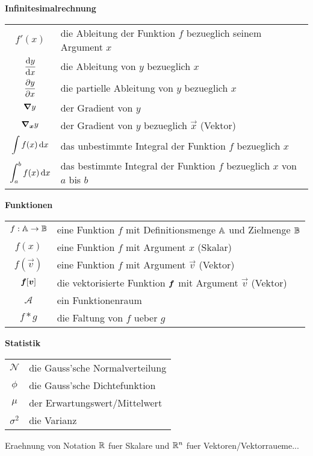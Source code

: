\begin{center}\textbf{Infinitesimalrechnung}\end{center}
\begin{tabular}{cl}
  $f'(x)$ & die Ableitung der Funktion $f$ bezueglich seinem Argument $x$ \\
  $\displaystyle\frac{\text{d}y}{\text{d}x}$ & die Ableitung von $y$ bezueglich $x$ \\[2ex]
  $\displaystyle\frac{\partial y}{\partial x}$ & die partielle Ableitung von $y$ bezueglich $x$ \\[2ex]
  $\bm{\nabla} y$ & der Gradient von $y$\\
  $\bm{\nabla}_{\bm{x}}y$ & der Gradient von $y$ bezueglich $\vec{x}$ (Vektor) \\
  $\displaystyle\int f(x)\,\text{d}x$ & das unbestimmte Integral der Funktion $f$ bezueglich $x$ \\
  $\displaystyle\int_a^b f(x)\,\text{d}x$ & das bestimmte Integral der Funktion $f$ bezueglich $x$ von $a$ bis $b$ \\

\end{tabular}

\begin{center}\textbf{Funktionen}\end{center}
\begin{tabular}{cl}
  $f: \mathbb{A} \to \mathbb{B}$ & eine Funktion $f$ mit Definitionsmenge $\mathbb{A}$ und Zielmenge $\mathbb{B}$ \\
  $f(x)$ & eine Funktion $f$ mit Argument $x$ (Skalar) \\
  $f(\vec{v})$ & eine Funktion $f$ mit Argument $\vec{v}$ (Vektor) \\
  $\bm{f}[\bm{v}]$ & die vektorisierte Funktion $\bm{f}$ mit Argument $\vec{v}$ (Vektor) \\
  $\mathcal{A}$ & ein Funktionenraum \\
  $f * g$ & die Faltung von $f$ ueber $g$ \\

\end{tabular}

\begin{center}\textbf{Statistik}\end{center}
\begin{tabular}{cl}
  $\mathcal{N}$ & die Gauss'sche Normalverteilung \\
  $\phi$ & die Gauss'sche Dichtefunktion \\
  $\mu$ & der Erwartungswert/Mittelwert \\
  $\sigma^2$ & die Varianz
\end{tabular}

Eraehnung von Notation $\mathbb{R}$ fuer Skalare und $\mathbb{R}^n$ fuer Vektoren/Vektorraueme...

